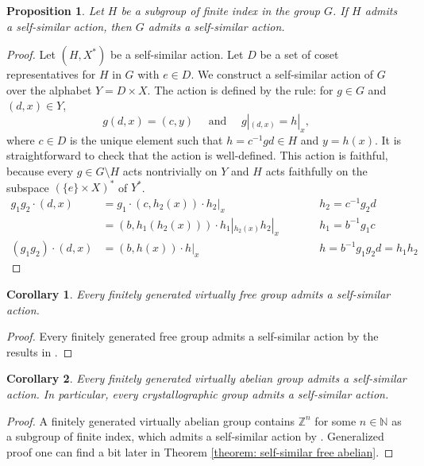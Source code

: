\documentclass[a4paper,12pt]{amsart}
\newtheorem{proposition}[theorem]{Proposition}
\newtheorem{corollary}{Corollary}[theorem]
\theoremstyle{definition}
\begin{document}
	
	\begin{proposition} \label{self-similar:subgroup}
		Let $H$ be a subgroup of finite index in the group $G$. If $H$ admits a self-similar action, then $G$ admits a self-similar action.
	\end{proposition}
	\begin{proof}
		Let $(H,X^{*})$ be a self-similar action. Let $D$ be a set of coset representatives for $H$ in $G$ with $e\in D$. We construct a self-similar action of $G$ over the alphabet $Y=D\times X$. The action is defined by the rule: for $g\in G$ and $(d,x)\in Y$,
		\[
		g(d,x)=(c,y) \quad \mbox{ and } \quad g|_{(d,x)}=h|_x,
		\]
		where $c\in D$ is the unique element such that $h=c^{-1}gd\in H$ and $y=h(x)$.
		It is straightforward to check that the action is well-defined. This action is faithful, because every $g\in G\setminus H$ acts nontrivially on $Y$ and $H$ acts faithfully on the subspace $(\{e\}\times X)^{*}$ of $Y^{*}$.
		\begin{align*} %
			g_1g_2 \cdot (d,x) &= g_1 \cdot (c,h_2(x)) \cdot h_2|_x \qquad && h_2=c^{-1}g_2d\\
			&= (b,h_1(h_2(x))) \cdot h_1|_{h_2(x)}h_2|_x \qquad && h_1=b^{-1}g_1c\\
			(g_1g_2) \cdot (d,x) &= (b,h(x)) \cdot h|_x \qquad && h=b^{-1}g_1g_2d=h_1h_2
		\end{align*}
		
	\end{proof}
	
		
	
	\begin{corollary}
		Every finitely generated virtually free group admits a self-similar action.
	\end{corollary}
	\begin{proof}
		Every finitely generated free group admits a self-similar action by the results in \cite{self-similar:free groups}.
	\end{proof}
	
	
	\begin{corollary} \label{cor: self-similar actions of cryst}
		Every finitely generated virtually abelian group admits a self-similar action. In particular, every crystallographic group admits a self-similar action.
	\end{corollary}
	\begin{proof}
		A finitely generated virtually abelian group contains $\mathbb{Z}^n$ for some $n\in\mathbb{N}$ as a subgroup of finite index, which admits a self-similar action by \cite{Nekrashevych:self-similar}. Generalized proof one can find a bit later in Theorem \ref{theorem: self-similar free abelian}.
	\end{proof}
	
\end{document}
